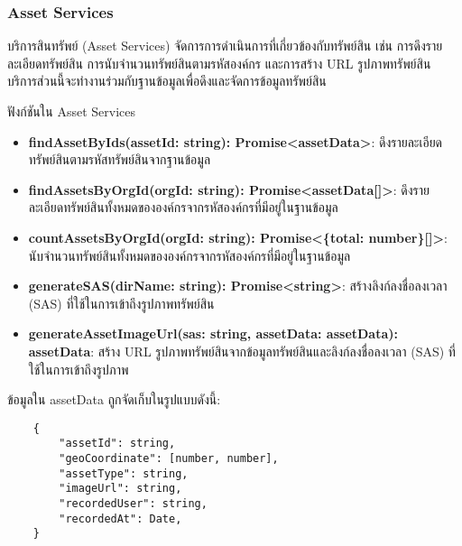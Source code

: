 \subsubsection{Asset Services}
\ifenglish
\else
บริการสินทรัพย์ (Asset Services) จัดการการดำเนินการที่เกี่ยวข้องกับทรัพย์สิน เช่น การดึงรายละเอียดทรัพย์สิน การนับจำนวนทรัพย์สินตามรหัสองค์กร และการสร้าง URL รูปภาพทรัพย์สิน บริการส่วนนี้จะทำงานร่วมกับฐานข้อมูลเพื่อดึงและจัดการข้อมูลทรัพย์สิน

ฟังก์ชันใน Asset Services

\begin{itemize}
    \item \textbf{findAssetByIds(assetId: string): Promise<assetData>}: ดึงรายละเอียดทรัพย์สินตามรหัสทรัพย์สินจากฐานข้อมูล
    \item \textbf{findAssetsByOrgId(orgId: string): Promise<assetData[]>}: ดึงรายละเอียดทรัพย์สินทั้งหมดขององค์กรจากรหัสองค์กรที่มีอยู่ในฐานข้อมูล
    \item \textbf{countAssetsByOrgId(orgId: string): Promise<\{total: number\}[]>}: นับจำนวนทรัพย์สินทั้งหมดขององค์กรจากรหัสองค์กรที่มีอยู่ในฐานข้อมูล
    \item \textbf{generateSAS(dirName: string): Promise<string>}: สร้างลิงก์ลงชื่อลงเวลา (SAS) ที่ใช้ในการเข้าถึงรูปภาพทรัพย์สิน
    \item \textbf{generateAssetImageUrl(sas: string,
    assetData: assetData): assetData}: สร้าง URL รูปภาพทรัพย์สินจากข้อมูลทรัพย์สินและลิงก์ลงชื่อลงเวลา (SAS) ที่ใช้ในการเข้าถึงรูปภาพ
\end{itemize}

ข้อมูลใน assetData ถูกจัดเก็บในรูปแบบดังนี้:
\begin{lstlisting}
    {
        "assetId": string,
        "geoCoordinate": [number, number],
        "assetType": string,
        "imageUrl": string,
        "recordedUser": string,
        "recordedAt": Date,
    }
\end{lstlisting}
\fi